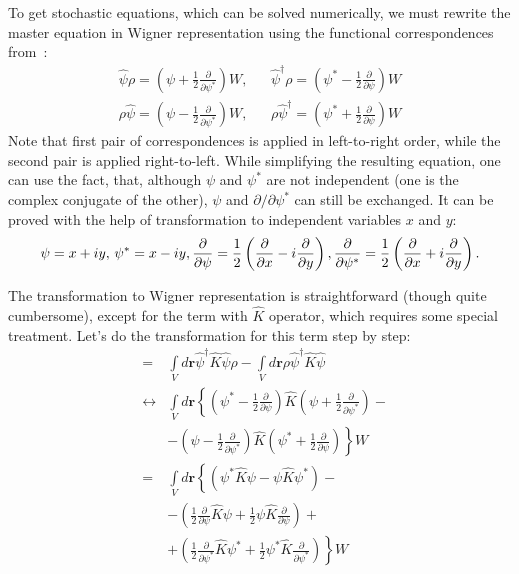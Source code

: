 \documentclass[12pt,notitlepage]{report}
\begin{document}
To get stochastic equations, which can be solved numerically,
we must rewrite the master equation in Wigner representation using the functional correspondences
from~\cite{gardiner_quantum_noise}:
\begin{eqnarray*}
\hat{\psi} \rho = \left( \psi + \frac{1}{2} \frac{\partial}{\partial \psi^*} \right) W, & &
\hat{\psi}^\dagger \rho = \left( \psi^* - \frac{1}{2} \frac{\partial}{\partial \psi} \right) W \\
\rho \hat{\psi} = \left( \psi - \frac{1}{2} \frac{\partial}{\partial \psi^*} \right) W, & &
\rho \hat{\psi}^\dagger = \left( \psi^* + \frac{1}{2} \frac{\partial}{\partial \psi} \right) W
\end{eqnarray*}
Note that first pair of correspondences is applied in left-to-right order, while the second pair is applied right-to-left.
While simplifying the resulting equation, one can use the fact, that, although $\psi$ and $\psi^*$ are not independent
(one is the complex conjugate of the other), $\psi$ and $\partial/\partial\psi^*$ can still be exchanged.
It can be proved with the help of transformation to independent variables $x$ and $y$:
\[
\psi = x + iy,\, \psi^* = x - iy,\, \\
\frac{\partial}{\partial\psi} = \frac{1}{2} \left( \frac{\partial}{\partial x} - i \frac{\partial}{\partial y} \right),\, \\
\frac{\partial}{\partial\psi^*} = \frac{1}{2} \left( \frac{\partial}{\partial x} + i \frac{\partial}{\partial y} \right).
\]

The transformation to Wigner representation is straightforward (though quite cumbersome),
except for the term with $\hat{K}$ operator, which requires some special treatment.
Let's do the transformation for this term step by step:
\begin{eqnarray}
[ \int\limits_V \hat{\psi}^\dagger \hat{K} \hat{\psi}, \rho ]
& = & \int\limits_V d\textbf{r} \hat{\psi}^\dagger \hat{K} \hat{\psi} \rho - \int\limits_V d\textbf{r} \rho \hat{\psi}^\dagger \hat{K} \hat{\psi} \nonumber \\
& \leftrightarrow & \int\limits_V d\textbf{r} \left\{ \left( \psi^* - \frac{1}{2}\frac{\partial}{\partial\psi}\right) \hat{K} \left( \psi + \frac{1}{2}\frac{\partial}{\partial\psi^*} \right) - \nonumber \right. \\
& & \left. - \left( \psi - \frac{1}{2}\frac{\partial}{\partial\psi^*}\right) \hat{K} \left( \psi^* + \frac{1}{2}\frac{\partial}{\partial\psi}  \right) \right\} W \nonumber \\
& = & \int\limits_V d\textbf{r} \left\{ \left( \psi^* \hat{K} \psi - \psi \hat{K} \psi^* \right) -  \right. \label{annihilating_psi_K_psi} \\
& & \left. - \left( \frac{1}{2}\frac{\partial}{\partial\psi} \hat{K} \psi +
\frac{1}{2} \psi \hat{K} \frac{\partial}{\partial\psi} \right) \right. + \label{dpsi_K_psi_term} \\
& & \left. + \left( \frac{1}{2}\frac{\partial}{\partial\psi^*} \hat{K} \psi^* +
\frac{1}{2} \psi^* \hat{K} \frac{\partial}{\partial\psi^*} \right) \right\} W \label{dpsi_star_K_psi_star_term}
\end{eqnarray}
\end{document}
